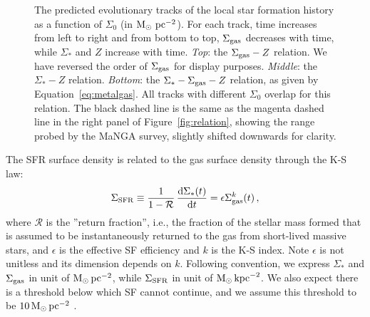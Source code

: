 \documentclass[12pt, appendixfloats, numberedappendix]{emulateapj}
\begin{document}

\begin{figure}
\caption{The predicted evolutionary tracks of the local star formation history 
as a function of $\Sigma_0$ (in $\mathrm{M}_\odot\,{\rm\,pc}^{-2}$). 
For each track, time increases from left to right and from bottom to top, 
$\Sigma_{\rm gas}$ decreases with time, while $\Sigma_{*}$ and $Z$ increase with time.
\textit{Top}: the $\Sigma_{\rm gas}-Z$ relation. We have reversed the order of $\Sigma_{\rm gas}$ for display purposes.
\textit{Middle}: the $\Sigma_{*}-Z$ relation. 
\textit{Bottom}: the $\Sigma_{*}-\Sigma_{\rm gas}-Z$ relation, as given by Equation~\ref{eq:metalgas}.
All tracks with different $\Sigma_0$ overlap for this relation. 
The black dashed line is the same as the magenta dashed line in the right panel of Figure~\ref{fig:relation}, showing the range probed by the MaNGA survey, slightly shifted downwards for clarity.
}
\vspace{0.2cm}
\label{fig:leakymodel}
\end{figure}


The SFR surface density is related to the gas surface density through the K-S law: 
\begin{equation}
\Sigma_{\rm SFR} \equiv \frac{1}{1-\mathcal{R}}\,\frac{{\rm d} \Sigma_{*}(t)}{{\rm d} t} = \epsilon \Sigma_{\rm gas}^k(t) \,\mathrm{,}
\label{eq:kslaw}
\end{equation}
\noindent where $\mathcal{R}$ is the ''return fraction'', i.e.,  
the fraction of the stellar mass formed that is assumed to be instantaneously returned 
to the gas from short-lived massive stars,
and $\epsilon$ is the effective SF efficiency and $k$ is the K-S index.
Note $\epsilon$ is not unitless and its dimension depends on $k$. 
Following convention, we express $\Sigma_{*}$ and $\Sigma_{\rm gas}$ in unit of $\rm M_\odot {\rm\,pc}^{-2}$,
while $\Sigma_{\rm SFR}$ in unit of $\rm M_\odot {\rm\,kpc}^{-2}$. 
We also expect there is a threshold below which SF cannot continue, and we assume this threshold to be $10\,\rm M_\odot{\rm\,pc}^{-2}$ \citep[\eg][]{skillman87a, schaye04a, leroy08a}.
\end{document}
